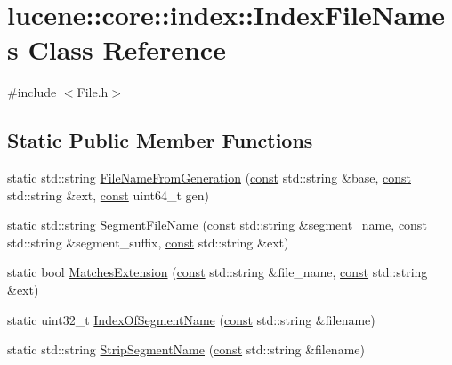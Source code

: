 \hypertarget{classlucene_1_1core_1_1index_1_1IndexFileNames}{}\section{lucene\+:\+:core\+:\+:index\+:\+:Index\+File\+Names Class Reference}
\label{classlucene_1_1core_1_1index_1_1IndexFileNames}


{\ttfamily \#include $<$File.\+h$>$}

\subsection*{Static Public Member Functions}
\begin{DoxyCompactItemize}
\item 
static std\+::string \mbox{\hyperlink{classlucene_1_1core_1_1index_1_1IndexFileNames_af6d6a7d61d9a5ddb12144eb3bddd66fc}{File\+Name\+From\+Generation}} (\mbox{\hyperlink{ZlibCrc32_8h_a2c212835823e3c54a8ab6d95c652660e}{const}} std\+::string \&base, \mbox{\hyperlink{ZlibCrc32_8h_a2c212835823e3c54a8ab6d95c652660e}{const}} std\+::string \&ext, \mbox{\hyperlink{ZlibCrc32_8h_a2c212835823e3c54a8ab6d95c652660e}{const}} uint64\+\_\+t gen)
\item 
static std\+::string \mbox{\hyperlink{classlucene_1_1core_1_1index_1_1IndexFileNames_a3a2dbc7b51a90635994c0e7a4bc38682}{Segment\+File\+Name}} (\mbox{\hyperlink{ZlibCrc32_8h_a2c212835823e3c54a8ab6d95c652660e}{const}} std\+::string \&segment\+\_\+name, \mbox{\hyperlink{ZlibCrc32_8h_a2c212835823e3c54a8ab6d95c652660e}{const}} std\+::string \&segment\+\_\+suffix, \mbox{\hyperlink{ZlibCrc32_8h_a2c212835823e3c54a8ab6d95c652660e}{const}} std\+::string \&ext)
\item 
static bool \mbox{\hyperlink{classlucene_1_1core_1_1index_1_1IndexFileNames_ac21b13c704efd30df1c91bbab3968ae8}{Matches\+Extension}} (\mbox{\hyperlink{ZlibCrc32_8h_a2c212835823e3c54a8ab6d95c652660e}{const}} std\+::string \&file\+\_\+name, \mbox{\hyperlink{ZlibCrc32_8h_a2c212835823e3c54a8ab6d95c652660e}{const}} std\+::string \&ext)
\item 
static uint32\+\_\+t \mbox{\hyperlink{classlucene_1_1core_1_1index_1_1IndexFileNames_a115465d4cd3343ca28ae0c83d6728868}{Index\+Of\+Segment\+Name}} (\mbox{\hyperlink{ZlibCrc32_8h_a2c212835823e3c54a8ab6d95c652660e}{const}} std\+::string \&filename)
\item 
static std\+::string \mbox{\hyperlink{classlucene_1_1core_1_1index_1_1IndexFileNames_a8edd9e86f2f73cc9ca3695cd4ef29f39}{Strip\+Segment\+Name}} (\mbox{\hyperlink{ZlibCrc32_8h_a2c212835823e3c54a8ab6d95c652660e}{const}} std\+::string \&filename)

\end{DoxyCompactItemize}
